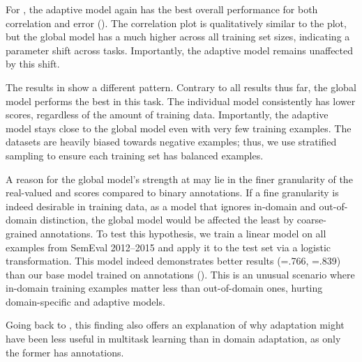 For \sas{}, the adaptive model again has the best overall performance for both
correlation and error ().  The correlation plot is
qualitatively similar to the \sts{} plot, but the global model has a much higher
 across all training set sizes, indicating a parameter shift across
tasks.  Importantly, the adaptive model remains unaffected by this shift.

The \asr{} results in  show a different pattern.
Contrary to all results thus far, the global model performs the best in this
task.  The individual model consistently has lower scores, regardless of the
amount of training data.  Importantly, the adaptive model stays close to the
global model even with very few training examples.  The \asr{} datasets are
heavily biased towards negative examples; thus, we use stratified sampling to
ensure each \asr{} training set has balanced examples.

A reason for the global model's strength at \asr{} may lie in
the finer granularity of the real-valued \sts{} and \sas{} scores compared to
binary \asr{} annotations.  If a fine granularity is indeed desirable in
training data, as a model that ignores in-domain and out-of-domain distinction, the
global model would be affected the least by coarse-grained \asr{} annotations.
To test this hypothesis, we train a linear model on all \sts{} examples from
SemEval 2012--2015 and apply it to the \asr{} test set via a logistic
transformation.  This model indeed demonstrates better results (=.766,
=.839) than our base model trained on \asr{} annotations
().  This is an unusual scenario where in-domain
training examples matter less than out-of-domain ones, hurting
domain-specific and adaptive models.

Going back to \sts{}, this finding also offers an explanation of why adaptation
might have been less useful in multitask learning than in domain adaptation,
as only the former has \asr{} annotations.
